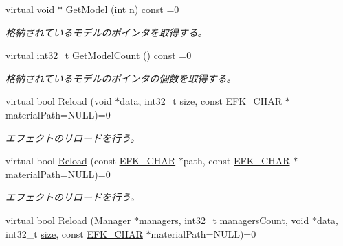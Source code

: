\begin{DoxyCompactItemize}
virtual \mbox{\hyperlink{namespace_effekseer_ab34c4088e512200cf4c2716f168deb56}{void}} $\ast$ \mbox{\hyperlink{class_effekseer_1_1_effect_ac54d6933252509f588a1332187136a1e}{Get\+Model}} (\mbox{\hyperlink{namespace_effekseer_ace0abf7c2e6947e519ebe8b54cbcc30a}{int}} n) const =0
\begin{DoxyCompactList}\small\item\em 格納されているモデルのポインタを取得する。 \end{DoxyCompactList}\item 
virtual int32\+\_\+t \mbox{\hyperlink{class_effekseer_1_1_effect_a2f080f7b32e11b7ea2a31744b69cefea}{Get\+Model\+Count}} () const =0
\begin{DoxyCompactList}\small\item\em 格納されているモデルのポインタの個数を取得する。 \end{DoxyCompactList}\item 
virtual bool \mbox{\hyperlink{class_effekseer_1_1_effect_a32c3c8d5a582f7ebaad34b1fb32e6d70}{Reload}} (\mbox{\hyperlink{namespace_effekseer_ab34c4088e512200cf4c2716f168deb56}{void}} $\ast$data, int32\+\_\+t \mbox{\hyperlink{namespace_effekseer_a73c68f3d33539d30844b9d1e058077f7}{size}}, const \mbox{\hyperlink{_effekseer_8h_aca7eb5de6dd019c19ac58ea35a193f2f}{E\+F\+K\+\_\+\+C\+H\+AR}} $\ast$material\+Path=N\+U\+LL)=0
\begin{DoxyCompactList}\small\item\em エフェクトのリロードを行う。 \end{DoxyCompactList}\item 
virtual bool \mbox{\hyperlink{class_effekseer_1_1_effect_acd86f6147154097e727246f7671d99ef}{Reload}} (const \mbox{\hyperlink{_effekseer_8h_aca7eb5de6dd019c19ac58ea35a193f2f}{E\+F\+K\+\_\+\+C\+H\+AR}} $\ast$path, const \mbox{\hyperlink{_effekseer_8h_aca7eb5de6dd019c19ac58ea35a193f2f}{E\+F\+K\+\_\+\+C\+H\+AR}} $\ast$material\+Path=N\+U\+LL)=0
\begin{DoxyCompactList}\small\item\em エフェクトのリロードを行う。 \end{DoxyCompactList}\item 
virtual bool \mbox{\hyperlink{class_effekseer_1_1_effect_a3159f076cc1c4201287c36867d5e1566}{Reload}} (\mbox{\hyperlink{class_effekseer_1_1_manager}{Manager}} $\ast$managers, int32\+\_\+t managers\+Count, \mbox{\hyperlink{namespace_effekseer_ab34c4088e512200cf4c2716f168deb56}{void}} $\ast$data, int32\+\_\+t \mbox{\hyperlink{namespace_effekseer_a73c68f3d33539d30844b9d1e058077f7}{size}}, const \mbox{\hyperlink{_effekseer_8h_aca7eb5de6dd019c19ac58ea35a193f2f}{E\+F\+K\+\_\+\+C\+H\+AR}} $\ast$material\+Path=N\+U\+LL)=0

\end{DoxyCompactItemize}
